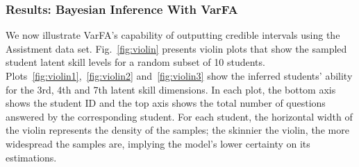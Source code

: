 \subsubsection{Results: Bayesian Inference With VarFA}
We now illustrate VarFA's capability of outputting credible intervals using the
Assistment data set.
%
Fig.~\ref{fig:violin} presents violin plots that show the sampled student
latent skill levels for a random subset of 10 students.
Plots~\ref{fig:violin1},~\ref{fig:violin2} and~\ref{fig:violin3} show the
inferred students' ability for the 3rd, 4th and 7th latent skill dimensions. In
each plot, the bottom axis shows the student ID and the top axis shows the
total number of questions answered by the corresponding student. For each
student, the horizontal width of the violin represents the density of the
samples; the skinnier the violin, the more widespread the samples are, implying
the model's lower certainty on its estimations.

